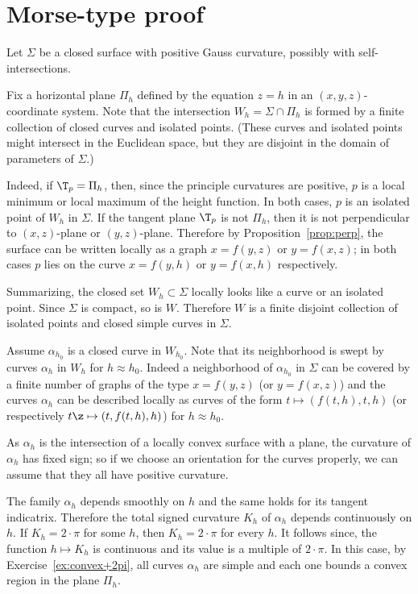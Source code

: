 \section*{Morse-type proof}

Let $\Sigma$ be a closed surface with positive Gauss curvature, possibly with self-intersections. 

Fix a horizontal plane $\Pi_h$ defined by the equation $z=h$ in an $(x,y,z)$-coordinate system.
Note that the intersection $W_h=\Sigma\cap\Pi_h$ is formed by a finite collection of closed curves and isolated points.
(These curves and isolated points might intersect in the Euclidean space, but they are disjoint in the domain of parameters of $\Sigma$.)

Indeed, if $\T_p=\Pi_h$, then, since the principle curvatures are positive, $p$ is a local minimum or local maximum of the height function.
In both cases, $p$ is an isolated point of $W_h$ in $\Sigma$.
If the tangent plane $\T_p$ is not $\Pi_h$, then it is not perpendicular to $(x,z)$-plane or $(y,z)$-plane.
Therefore by Proposition~\ref{prop:perp}, the surface can be written locally as a graph $x=f(y,z)$ or $y=f(x,z)$;
in both cases $p$ lies on the curve $x=f(y,h)$ or $y=f(x,h)$ respectively.

Summarizing, the closed set $W_h\subset \Sigma$ locally looks like a curve or an isolated point.
Since $\Sigma$ is compact, so is $W$.
Therefore $W$ is a finite disjoint collection of isolated points and closed simple curves in $\Sigma$.

Assume $\alpha_{h_0}$ is a closed curve in $W_{h_0}$.
Note that its neighborhood is swept by curves $\alpha_h$ in $W_{h}$ for $h\approx h_0$.
Indeed a neighborhood of $\alpha_{h_0}$ in $\Sigma$ can be covered by a finite number of graphs of the type $x=f(y,z)$ (or $y=f(x,z)$) and the curves $\alpha_h$ can be described locally as curves of the form $t\mapsto (f(t,h),t,h)$ (or respectively $t\z\mapsto(t,f(t,h),h)$) for $h\approx h_0$.

As $\alpha_h$ is the intersection of a locally convex surface with a plane,
the curvature of $\alpha_h$ has fixed sign;
so if we choose an orientation for the curves properly, we can assume that they all have positive curvature.

The family $\alpha_h$ depends smoothly on $h$ and the same holds for its tangent indicatrix.
Therefore the total signed curvature $K_h$ of $\alpha_h$ depends continuously on $h$.
If $K_h=2\cdot\pi$ for some $h$, then $K_h=2\cdot\pi$ for every $h$.
It follows since, the function $h\mapsto K_h$ is continuous and its value is a multiple of $2\cdot\pi$.
In this case, by Exercise~\ref{ex:convex+2pi}, all curves $\alpha_h$ are simple and each one bounds a convex region in the plane $\Pi_h$.


